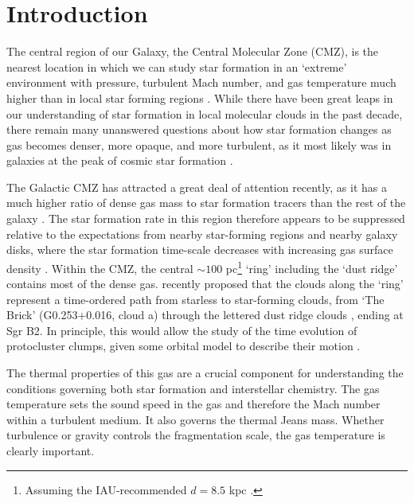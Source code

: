 
\maketitle


\section{Introduction}
The central region of our Galaxy, the Central Molecular Zone (CMZ), is the
nearest location in which we can study star formation in an `extreme'
environment with pressure, turbulent Mach number, and gas temperature much
higher than in local star forming regions \citep{Morris1996a}.  While there
have been great leaps in our understanding of star formation in local
molecular clouds in the past decade, there remain many unanswered questions
about how star formation changes as gas becomes denser, more opaque, and more
turbulent, as it most likely was in galaxies at the peak of cosmic star
formation \citep{Kruijssen2013a}.


The Galactic CMZ has attracted a great deal of attention recently, as it has a
much higher ratio of dense gas mass to star formation tracers than the rest of
the galaxy
\citep{Longmore2013a,Longmore2012b,Longmore2013b,Kruijssen2014c,Yusef-Zadeh2009a,Immer2012a}.
The star formation rate in this region therefore appears to be suppressed
relative to the expectations from nearby star-forming regions and nearby galaxy
disks, where the star formation time-scale decreases with increasing gas
surface density
\citep{Kennicutt1998a,Kennicutt2012a,Leroy2013a,Heiderman2010a}.  Within the
CMZ, the central $\sim100$ pc\footnote{Assuming the IAU-recommended $d=8.5$ kpc
\citep{Ghez2008a,Gillessen2009b,Reid2009a,Gillessen2013b}.} `ring' including
the  `dust ridge' \citep{Lis1991a,Sofue1995a,Molinari2011a} contains most of
the dense gas.  \citet{Longmore2013a} recently proposed that the clouds along
the `ring' \citep[which is more accurately described as a
`stream';][]{Kruijssen2015a} represent a time-ordered path from starless to
star-forming clouds, from `The Brick' (G0.253+0.016, cloud a) through the
lettered dust ridge clouds \citep[clouds b,c,d,e,f][]{Lis1999a}, ending at Sgr
B2.  In principle, this would allow the study of the time evolution of
protocluster clumps, given some orbital model to describe their motion
\citep{Kruijssen2015a}.

The thermal properties of this gas are a crucial component for understanding
the conditions governing both star formation and interstellar chemistry.  The
gas temperature sets the sound speed in the gas and therefore the Mach number
within a turbulent medium.  It also governs the thermal Jeans mass.  Whether
turbulence or gravity controls the fragmentation scale, the gas temperature is
clearly important.  

